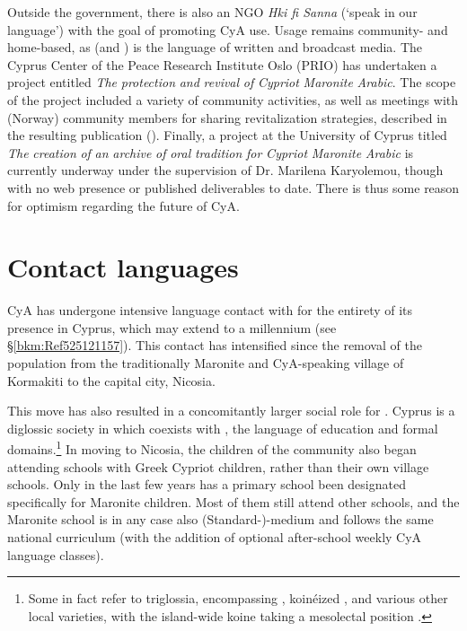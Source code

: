 \documentclass[output=paper]{langsci/langscibook}
\begin{document}
Outside the government, there is also an NGO \textit{Hki fi Sanna} (‘speak in our language’) with the goal of promoting CyA use. Usage remains community- and home-based, as  (and ) is the language of written and broadcast media. The {Cyprus} Center of the Peace Research Institute Oslo (PRIO) has undertaken a project entitled \textit{The} \textit{protection} \textit{and} \textit{revival} \textit{of} \textit{Cypriot} \textit{Maronite} \textit{Arabic}. The scope of the project included a variety of community activities, as well as meetings with  (Norway) community members for sharing revitalization strategies, described in the resulting publication (\citealt{PRIO2009}). Finally, a project at the University of {Cyprus} titled \textit{The} \textit{creation} \textit{of} \textit{an} \textit{archive} \textit{of} \textit{oral} \textit{tradition} \textit{for} \textit{Cypriot} \textit{Maronite} \textit{Arabic} is currently underway under the supervision of Dr. Marilena Karyolemou, though with no web presence or published deliverables to date. There is thus some reason for optimism regarding the {future} of CyA.

\section{\label{bkm:Ref525122525}Contact languages}


CyA has undergone {intensive} language contact with  for the entirety of its presence in {Cyprus}, which may extend to a millennium (see §\ref{bkm:Ref525121157}). This contact has intensified since the removal of the population from the traditionally Maronite and CyA-speaking village of {Kormakiti} to the capital city, Nicosia.


This move has also resulted in a concomitantly larger social role for . {Cyprus} is a diglossic society in which  coexists with , the language of education and formal domains.\footnote{Some in fact refer to triglossia, encompassing , koinéized , and various other local varieties, with the island-wide koine taking a mesolectal position \citep{Arvaniti2010}.} In moving to Nicosia, the children of the community also began attending schools with Greek Cypriot children, rather than their own village schools. Only in the last few years has a primary school been designated specifically for Maronite children. Most of them still attend other schools, and the Maronite school is in any case also ({Standard}-)-medium and follows the same national curriculum (with the addition of optional after-school weekly CyA language classes).
\end{document}
